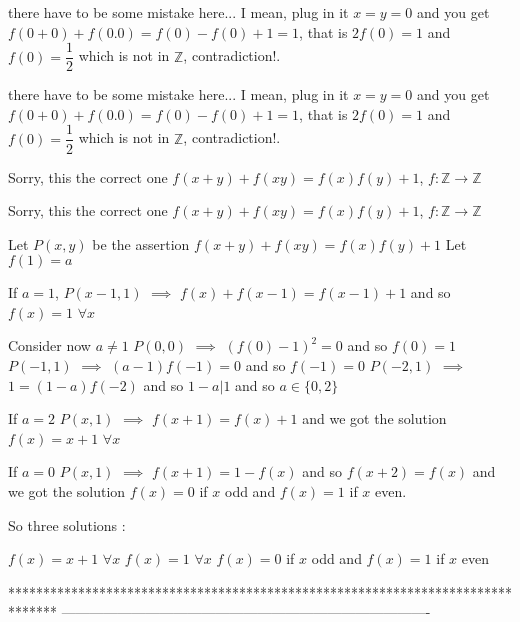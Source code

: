 \begin{solution}
	there have to be some mistake here... I mean, plug in it $ x = y = 0$ and you get $ f(0+0)+f(0.0) = f(0)-f(0)+1 = 1$, that is $ 2f(0) = 1$ and $ f(0) = \dfrac{1}{2}$ which is not in $ \mathbb{Z}$, contradiction!.
\end{solution}



\begin{solution}
	\begin{tcolorbox}there have to be some mistake here... I mean, plug in it $ x = y = 0$ and you get $ f(0 + 0) + f(0.0) = f(0) - f(0) + 1 = 1$, that is $ 2f(0) = 1$ and $ f(0) = \dfrac{1}{2}$ which is not in $ \mathbb{Z}$, contradiction!.\end{tcolorbox}

Sorry, this the correct one 
$ f(x+y) + f(xy) = f(x)f(y) +1$, $ f : \mathbb{Z} \rightarrow \mathbb{Z}$
\end{solution}



\begin{solution}
	\begin{tcolorbox} Sorry, this the correct one 
$ f(x + y) + f(xy) = f(x)f(y) + 1$, $ f : \mathbb{Z} \rightarrow \mathbb{Z}$\end{tcolorbox}

Let $ P(x,y)$ be the assertion $ f(x + y) + f(xy) = f(x)f(y) + 1$
Let $ f(1)=a$

If $ a=1$, $ P(x-1,1)$ $ \implies$ $ f(x)+f(x-1)=f(x-1)+1$ and so $ f(x)=1$ $ \forall x$

Consider now $ a\neq 1$
$ P(0,0)$ $ \implies$ $ (f(0)-1)^2=0$ and so $ f(0)=1$
$ P(-1,1)$ $ \implies$ $ (a-1)f(-1)=0$ and so $ f(-1)=0$
$ P(-2,1)$ $ \implies$ $ 1 = (1-a)f(-2)$ and so $ 1-a|1$ and so $ a\in\{0,2\}$

If $ a=2$ $ P(x,1)$ $ \implies$ $ f(x+1)=f(x)+1$ and we got the solution $ f(x)=x+1$ $ \forall x$

If $ a=0$ $ P(x,1)$ $ \implies$ $ f(x+1)=1-f(x)$ and so $ f(x+2)=f(x)$ and we got the solution $ f(x)=0$ if $ x$ odd and $ f(x)=1$ if $ x$ even.

So three solutions :

$ f(x)=x+1$ $ \forall x$
$ f(x)=1$ $ \forall x$
$ f(x)=0$ if $ x$ odd and $ f(x)=1$ if $ x$ even
\end{solution}
*******************************************************************************
-------------------------------------------------------------------------------

